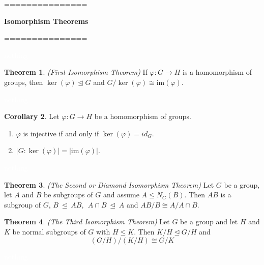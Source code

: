 \documentclass{article}
\theoremstyle{definition}
\newtheorem{thm}{Theorem}[section]
\newtheorem{cor}[thm]{Corollary}
\newcommand{\nl}{\textcolor{white}{nothing}}
\newcommand{\ra}{\rightarrow}
\newcommand{\im}{\text{im}}
\newcommand{\vphi}{\varphi}
\begin{document}
===============

\textbf{Isomorphism Theorems}

===============

\nl

\begin{thm}\textit{(First Isomorphism Theorem)}
If $\vphi:G \ra H$ is a homomorphism of groups, then $\ker(\vphi)\unlhd G$ and $G/\ker(\vphi) \cong \im(\vphi)$.
\end{thm}

\nl

\begin{cor}
Let $\vphi: G\ra H$ be a homomorphism of groups.
\begin{enumerate}
\item $\vphi$ is injective if and only if $\ker(\vphi) = id_G$.
\item $|G:\ker(\vphi)| = |\im(\vphi)|$.
\end{enumerate}
\end{cor}

\nl

\begin{thm}\textit{(The Second or Diamond Isomorphism Theorem)}
Let $G$ be a group, let $A$ and $B$ be subgroups of $G$ and assume $A\leq N_G(B)$. Then $AB$ is a subgroup of $G$, $B\ \unlhd\  AB,\ \ A\cap B\ \unlhd\  A$ and $AB/B\cong A/A\cap B$.
\end{thm}

\begin{center}
\end{center}


\begin{thm}\textit{(The Third Isomorphism Theorem)}
Let $G$ be a group and let $H$ and $K$ be normal subgroups of $G$ with $H\leq K$. Then $K/H\unlhd G/H$ and 
\[(G/H)/(K/H)\cong G/K\]
\end{thm}

\nl
\end{document}
